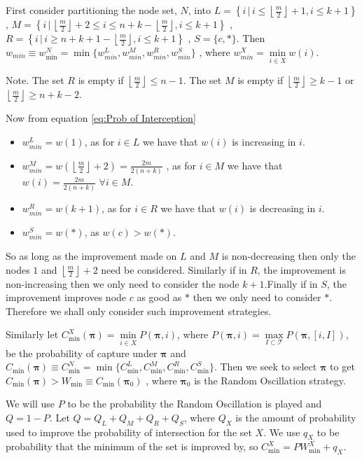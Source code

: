 \documentclass[a4paper,10pt]{article}
\newcommand{\floor}[1]{\left \lfloor #1 \right \rfloor}
\theoremstyle{definition}
\theoremstyle{definition}
\theoremstyle{remark}
\theoremstyle{definition}
\begin{document}
First consider partitioning the node set, $N$, into $L=\left\{ i \, | \, i \leq \floor{\frac{m}{2}}+1 , i \leq k+1 \right\}$ , $M=\left\{ i \, | \, \floor{\frac{m}{2}}+2 \leq i \leq n+k-\floor{\frac{m}{2}} , i \leq k+1 \right\}$ , $R=\left\{ i \, | \, i \geq n+k+1-\floor{\frac{m}{2}} , i \leq k+1 \right\}$ , $S=\{ c,* \}$. Then $w_{min} \equiv w_{\min}^{N}=\min \{ w_{min}^{L},w_{min}^{M},w_{min}^{R},w_{min}^{S} \}$ , where $w_{min}^{X}=\min\limits_{i \in X} w(i)$.

Note. The set $R$ is empty if $\floor{\frac{m}{2}} \leq n-1$. The set $M$ is empty if $\floor{\frac{m}{2}} \geq k-1$ or $\floor{\frac{m}{2}} \geq n+k-2$.

Now from equation \ref{eq:Prob of Interception}
\begin{itemize}
\item $w_{min}^{L}=w(1)$, as for $i \in L$ we have that $w(i)$ is increasing in $i$.
\item $w_{min}^{M}=w(\floor{\frac{m}{2}}+2)=\frac{2m}{2(n+k)}$ , as for $i \in M $ we have that $w(i)=\frac{2m}{2(n+k)}$ $\forall i \in M$.
\item $w_{min}^{R}=w(k+1)$, as for $i \in R$ we have that $w(i)$ is decreasing in $i$.
\item $w_{min}^{S}=w(*)$, as $w(c) > w(*)$.
\end{itemize}

So as long as the improvement made on $L$ and $M$ is non-decreasing then only the nodes $1$ and $\floor{\frac{m}{2}}+2$ need be considered. Similarly if in $R$, the improvement is non-increasing then we only need to consider the node $k+1$.Finally if in $S$, the improvement improves node $c$ as good as $*$ then we only need to consider $*$. Therefore we shall only consider such improvement strategies.

Similarly let $C_{\min}^{X} (\bm{\pi}) = \min\limits_{i \in X} P(\bm{\pi},i)$, where $P(\bm{\pi},i)=\max\limits_{ I \subset \mathcal{T}} P(\bm{\pi},[i,I])$, be the probability of capture under $\bm{\pi}$ and $C_{\min} (\bm{\pi}) \equiv C_{\min}^{N} = \min \{ C_{\min}^{L},  C_{\min}^{M},  C_{\min}^{R},  C_{\min}^{S} \}$. Then we seek to select $\bm{\pi}$ to get $C_{\min} (\bm{\pi}) > W_{\min} \equiv C_{\min}(\bm{\pi}_{0})$ , where $\bm{\pi}_{0}$ is the Random Oscillation strategy.

We will use $P$ to be the probability the Random Oscillation is played and $Q=1-P$. Let $Q=Q_{L}+Q_{M}+Q_{R}+Q_{S}$, where $Q_{X}$ is the amount of probability used to improve the probability of intersection for the set $X$. We use $q_{X}$ to be probability that the minimum of the set is improved by, so $C_{\min}^{X}=PW_{\min}^{X}+q_{X}$.
\end{document}
